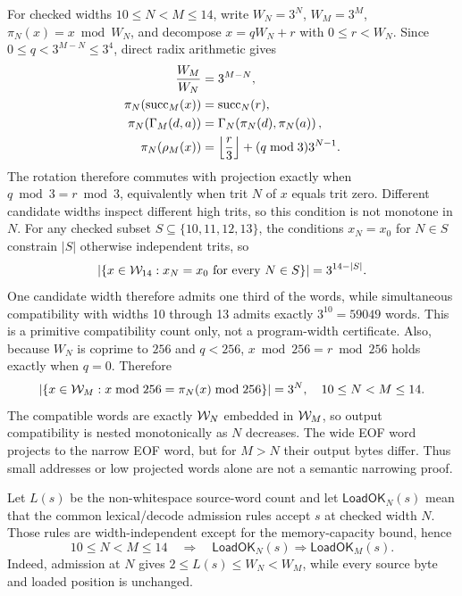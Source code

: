 \documentclass{article}
\begin{document}
For checked widths $10\leq N<M\leq14$, write $W_N=3^N$, $W_M=3^M$,
$\pi_N(x)=x\bmod W_N$, and decompose $x=qW_N+r$ with
$0\leq r<W_N$. Since $0\leq q<3^{M-N}\leq3^4$, direct radix arithmetic gives
\begin{equation}
  \begin{aligned}
    \frac{W_M}{W_N} &= 3^{M-N}, \\
    \pi_N(\operatorname{succ}_M(x)) &= \operatorname{succ}_N(r), \\
    \pi_N(\Gamma_{M}\!\left(d,a\right))
      &= \Gamma_{N}\!\left(\pi_N(d),\pi_N(a)\right), \\
    \pi_N(\rho_{M}\!\left(x\right))
      &= \left\lfloor\frac{r}{3}\right\rfloor
         +(q\bmod3)3^{N-1}.
  \end{aligned}
  \label{eq:optimization-profile-width-projection-audit}
\end{equation}
The rotation therefore commutes with projection exactly when
$q\bmod3=r\bmod3$, equivalently when trit $N$ of $x$ equals trit zero.
Different candidate widths inspect different high trits, so this condition is
not monotone in $N$. For any checked subset
$S\subseteq\{10,11,12,13\}$, the conditions $x_N=x_0$ for $N\in S$ constrain
$|S|$ otherwise independent trits, so
\begin{equation}
  \left|\left\{x\in\mathcal{W}_{14}:
      x_N=x_0\text{ for every }N\in S\right\}\right|
    = 3^{14-|S|}.
  \label{eq:optimization-profile-width-rotate-compatible-count}
\end{equation}
One candidate width therefore admits one third of the words, while simultaneous
compatibility with widths 10 through 13 admits exactly $3^{10}=59049$ words.
This is a primitive compatibility count only, not a program-width certificate.
Also, because $W_N$ is coprime to $256$ and $q<256$,
$x\bmod256=r\bmod256$ holds exactly when $q=0$. Therefore
\begin{equation}
  \left|\left\{x\in\mathcal{W}_{M}:
    x\bmod256=\pi_N(x)\bmod256\right\}\right|=3^N,
  \quad 10\leq N<M\leq14.
  \label{eq:optimization-profile-width-output-compatible-count}
\end{equation}
The compatible words are exactly $\mathcal{W}_{N}$ embedded in
$\mathcal{W}_{M}$, so output compatibility is nested monotonically as $N$
decreases. The wide EOF word projects to the narrow EOF word, but for $M>N$
their output bytes differ. Thus small addresses or low projected words alone
are not a semantic narrowing proof.

Let $L(s)$ be the non-whitespace source-word count and let
$\mathsf{LoadOK}_N(s)$ mean that the common lexical/decode admission rules
accept $s$ at checked width $N$. Those rules are width-independent except for
the memory-capacity bound, hence
\begin{equation}
  10\leq N<M\leq14
  \quad\Longrightarrow\quad
  \mathsf{LoadOK}_N(s)\Longrightarrow\mathsf{LoadOK}_M(s).
  \label{eq:optimization-profile-width-source-admission-monotonicity}
\end{equation}
Indeed, admission at $N$ gives $2\leq L(s)\leq W_N<W_M$, while every source
byte and loaded position is unchanged.
\end{document}
